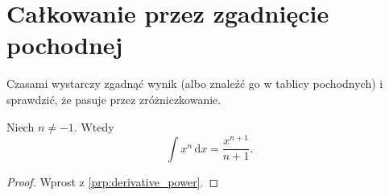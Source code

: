 %

\section{Całkowanie przez zgadnięcie pochodnej}

Czasami wystarczy zgadnąć wynik (albo znaleźć go w tablicy pochodnych) i sprawdzić, że pasuje przez zróżniczkowanie.

\begin{problem}
    Niech $n \neq -1$.
    Wtedy
    \begin{equation}
        \int x^n \,\mathrm{d}x = \frac{x^{n+1}}{n+1}.
    \end{equation}
\end{problem}

\begin{proof}
    Wprost z \ref{prp:derivative_power}.
\end{proof}

%